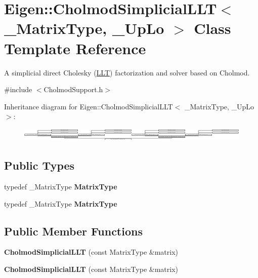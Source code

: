 \hypertarget{class_eigen_1_1_cholmod_simplicial_l_l_t}{}\section{Eigen\+:\+:Cholmod\+Simplicial\+L\+LT$<$ \+\_\+\+Matrix\+Type, \+\_\+\+Up\+Lo $>$ Class Template Reference}
\label{class_eigen_1_1_cholmod_simplicial_l_l_t}


A simplicial direct Cholesky (\hyperlink{group___cholesky___module_class_eigen_1_1_l_l_t}{L\+LT}) factorization and solver based on Cholmod.  




{\ttfamily \#include $<$Cholmod\+Support.\+h$>$}

Inheritance diagram for Eigen\+:\+:Cholmod\+Simplicial\+L\+LT$<$ \+\_\+\+Matrix\+Type, \+\_\+\+Up\+Lo $>$\+:\begin{figure}[H]
\begin{center}
\leavevmode
\includegraphics[height=0.642202cm]{class_eigen_1_1_cholmod_simplicial_l_l_t}
\end{center}
\end{figure}
\subsection*{Public Types}
\begin{DoxyCompactItemize}
\item 
\mbox{\label{class_eigen_1_1_cholmod_simplicial_l_l_t_a88c7441fa03aed599eba4f29492e7fe4}} 
typedef \+\_\+\+Matrix\+Type {\bfseries Matrix\+Type}
\item 
\mbox{\label{class_eigen_1_1_cholmod_simplicial_l_l_t_a88c7441fa03aed599eba4f29492e7fe4}} 
typedef \+\_\+\+Matrix\+Type {\bfseries Matrix\+Type}
\end{DoxyCompactItemize}
\subsection*{Public Member Functions}
\begin{DoxyCompactItemize}
\item 
\mbox{\label{class_eigen_1_1_cholmod_simplicial_l_l_t_a5f0aaf18cba4b276da9946f968fbf14b}} 
{\bfseries Cholmod\+Simplicial\+L\+LT} (const Matrix\+Type \&matrix)
\item 
\mbox{\label{class_eigen_1_1_cholmod_simplicial_l_l_t_a5f0aaf18cba4b276da9946f968fbf14b}} 
{\bfseries Cholmod\+Simplicial\+L\+LT} (const Matrix\+Type \&matrix)
\end{DoxyCompactItemize}
